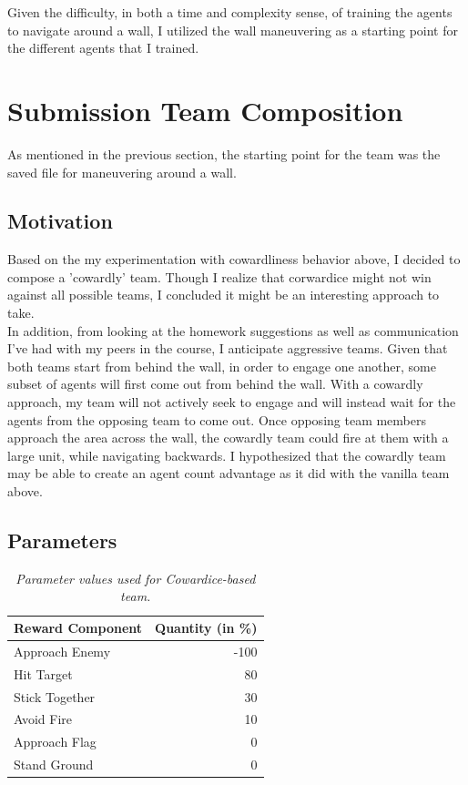 \documentclass{article} %
\begin{document}
Given the difficulty, in both a time and complexity sense, of training the agents to navigate around a wall, I utilized the wall maneuvering as a starting point for the different agents that I trained.

\section{Submission Team Composition}
As mentioned in the previous section, the starting point for the team was the saved file for maneuvering around a wall.
\subsection{Motivation}
Based on the my experimentation with cowardliness behavior above, I decided to compose a 'cowardly' team. Though I realize that corwardice might not win against all possible teams, I concluded it might be an interesting approach to take. 
\\[1\baselineskip] In addition, from looking at the homework suggestions as well as communication I've had with my peers in the course, I anticipate aggressive teams. Given that both teams start from behind the wall, in order to engage one another, some subset of agents will first come out from behind the wall. With a cowardly approach, my team will not actively seek to engage and will instead wait for the agents from the opposing team to come out. Once opposing team members approach the area across the wall, the cowardly team could fire at them with a large unit, while navigating backwards. I hypothesized that the cowardly team may be able to create an agent count advantage as it did with the vanilla team above.
\subsection{Parameters}

\begin{table}[H]
  \centering
  \begin{tabular}{l|r}
  Reward Component & Quantity (in \%) \\\hline
  Approach Enemy & -100 \\
  Hit Target & 80 \\
  Stick Together & 30 \\
  Avoid Fire & 10 \\
  Approach Flag & 0 \\
  Stand Ground & 0 
  \end{tabular}
  \caption{\label{tab:widgets}\textit{Parameter values used for Cowardice-based team.}}
\end{table}
\end{document}
